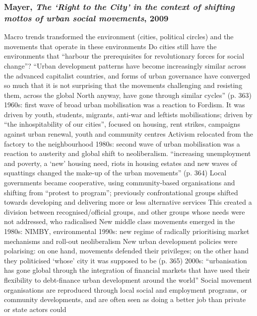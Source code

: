 \documentclass{article}
\begin{document}
\subsubsection{Mayer, \textit{The `Right to the City' in the context of shifting mottos of urban social movements}, 2009}

\begin{outline}
	\1 Macro trends transformed the environment (cities, political circles) and the movements that operate in these environments 
	\1 Do cities still have the environments that ``harbour the prerequisites for revolutionary forces for social change''? 
	\1 ``Urban development patterns have become increasingly similar across the advanced capitalist countries, and forms of urban governance have converged so much that it is not surprising that the movements challenging and resisting them, across the global North anyway, have gone through similar cycles'' (p. 363)
	\1 1960s: first wave of broad urban mobilisation was a reaction to Fordism. It was driven by youth, students, migrants, anti-war and leftists mobilisations; driven by ``the inhospitability of our cities'', focused on housing, rent strikes, campaigns against urban renewal, youth and community centres
		\2 Activism relocated from the factory to the neighbourhood
	\1 1980s: second wave of urban mobilisation was a reaction to austerity and global shift to neoliberalism.
		\2 ``increasing unemployment and poverty, a `new' housing  need, riots in housing estates and new waves of squattings changed the make-up of the urban movements'' (p. 364)
		\2 Local governments became cooperative, using community-based organisations and shifting from ``protest to program''; previously confrontational groups shifted towards developing and delivering more or less alternative services
		\2 This created a division between recognised/official groups, and other groups whose needs were not addressed, who radicalised
		\2 New middle class movements emerged in the 1980s: NIMBY, environmental
	\1 1990s: new regime of radically prioritising market mechanisms and roll-out neoliberalism
		\2 New urban development policies were polarising: on one hand, movements defended their privileges; on the other hand they politicised `whose' city it was supposed to be (p. 365)
	\1 2000s: ``urbanisation has gone global through the integration of financial markets that have used their flexibility to debt-finance urban development around the world''
		\2 Social movement organisations are reproduced through local social and employment programs, or community developments, and are often seen as doing a better job than private or state actors could

\end{outline}
\end{document}
